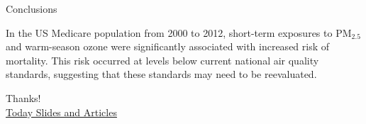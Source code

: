 \documentclass[ignorenonframetext,]{beamer}
\begin{document}
\begin{frame}{Conclusions}

In the US Medicare population from 2000 to 2012, short-term exposures to
PM\(_{2.5}\) and warm-season ozone were significantly associated with
increased risk of mortality. This risk occurred at levels below current
national air quality standards, suggesting that these standards may need
to be reevaluated.

\end{frame}

\begin{frame}{}

Thanks!\\
\href{https://github.com/fyGuo/Journal-club/tree/master/20201130\%20JAMA\%20Di}{Today
Slides and Articles}

\end{frame}
\end{document}
